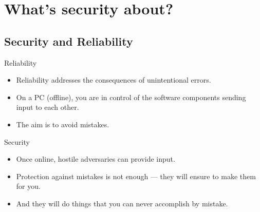 


\section{What's security about?}

\subsection{Security and Reliability}

\begin{frame}
  \begin{block}{Reliability}
    \begin{itemize}
      \item Reliability addresses the consequences of unintentional errors.

      \item On a PC (offline), you are in control of the software components 
        sending input to each other.

      \item The aim is to avoid mistakes.
    \end{itemize}
  \end{block}

  \pause{}

  \begin{block}{Security}
    \begin{itemize}
      \item Once online, hostile adversaries can provide input.

      \item Protection against mistakes is not enough --- they will ensure to 
        make them for you.

      \item And they will do things that you can never accomplish by mistake.
    \end{itemize}
  \end{block}
\end{frame}

